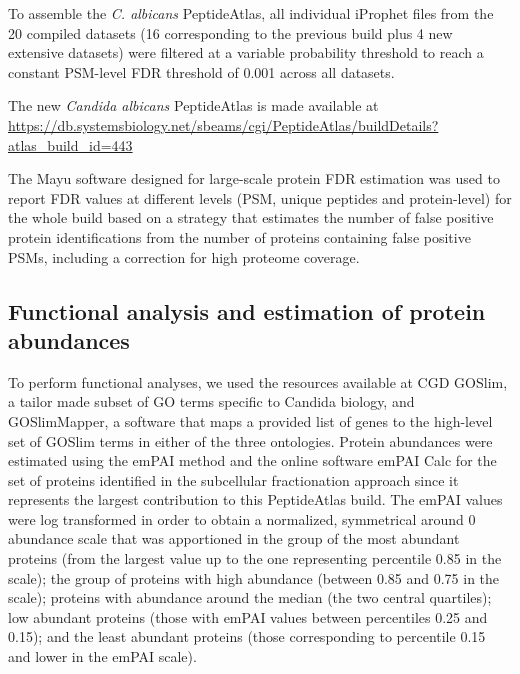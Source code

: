 To assemble the \textit{C. albicans} PeptideAtlas, all individual iProphet files from the 20 compiled
datasets (16 corresponding to the previous build plus 4 new extensive datasets) were filtered
at a variable probability threshold to reach a constant PSM-level FDR threshold of 0.001
across all datasets.

The new \textit{Candida albicans} PeptideAtlas is made available at \linebreak
\href{https://db.systemsbiology.net/sbeams/cgi/PeptideAtlas/buildDetails?atlas_build_id=443}{https://db.systemsbiology.net/sbeams/cgi/PeptideAtlas/buildDetails?atlas\_build\_id=443}
\linebreak

The Mayu \citep{Reiter2009} software designed for large-scale protein FDR estimation was used to report
FDR values at different levels (PSM, unique peptides and protein-level) for the whole build
based on a strategy that estimates the number of false positive protein identifications from
the number of proteins containing false positive PSMs, including a correction for high
proteome coverage.



\subsection*{Functional analysis and estimation of protein abundances}

To perform functional analyses, we used the resources available at CGD GOSlim, a tailor
made subset of GO terms specific to Candida biology, and GOSlimMapper, a software that
maps a provided list of genes to the high-level set of GOSlim terms in either of the three
ontologies.
Protein abundances were estimated using the emPAI method \citep{Ishihama2005} and the online software
emPAI Calc \citep{Shinoda2010} for the set of proteins identified in the subcellular fractionation approach
since it represents the largest contribution to this PeptideAtlas build. The emPAI values were
log transformed in order to obtain a normalized, symmetrical around 0 abundance scale that
was apportioned in the group of the most abundant proteins (from the largest value up to the
one representing percentile 0.85 in the scale); the group of proteins with high abundance
(between 0.85 and 0.75 in the scale); proteins with abundance around the median (the two
central quartiles); low abundant proteins (those with emPAI values between percentiles 0.25
and 0.15); and the least abundant proteins (those corresponding to percentile 0.15 and lower
in the emPAI scale).



